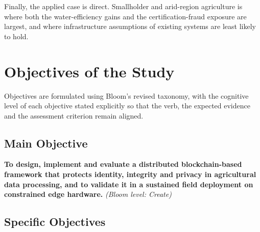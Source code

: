 \documentclass[12pt,a4paper,oneside]{book}
\begin{document}
Finally, the applied case is direct. Smallholder and arid-region agriculture is
where both the water-efficiency gains and the certification-fraud exposure are
largest, and where infrastructure assumptions of existing systems are least
likely to hold.

\section{Objectives of the Study}
\label{sec:objectives}

Objectives are formulated using Bloom's revised taxonomy, with the cognitive
level of each objective stated explicitly so that the verb, the expected
evidence and the assessment criterion remain aligned.

\subsection{Main Objective}
\label{subsec:main_objective}

\textbf{To design, implement and evaluate a distributed blockchain-based
framework that protects identity, integrity and privacy in agricultural data
processing, and to validate it in a sustained field deployment on constrained
edge hardware.} \textit{(Bloom level: Create)}

\subsection{Specific Objectives}
\label{subsec:specific_objectives}
\end{document}
